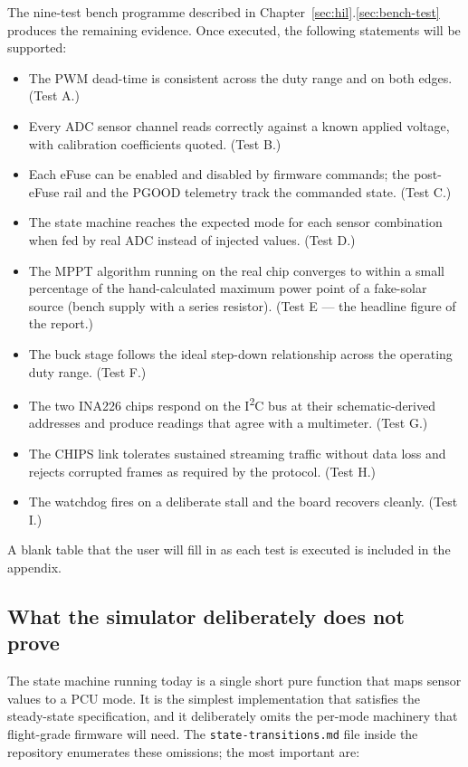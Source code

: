 The nine-test bench programme described in
Chapter~\ref{sec:hil}.\ref{sec:bench-test} produces the
remaining evidence. Once executed, the following statements
will be supported:

\begin{itemize}
\item The PWM dead-time is consistent across the duty range and
on both edges. (Test A.)
\item Every ADC sensor channel reads correctly against a known
applied voltage, with calibration coefficients quoted. (Test B.)
\item Each eFuse can be enabled and disabled by firmware
commands; the post-eFuse rail and the PGOOD telemetry track the
commanded state. (Test C.)
\item The state machine reaches the expected mode for each
sensor combination when fed by real ADC instead of injected
values. (Test D.)
\item The MPPT algorithm running on the real chip converges to
within a small percentage of the hand-calculated maximum power
point of a fake-solar source (bench supply with a series
resistor). (Test E --- the headline figure of the report.)
\item The buck stage follows the ideal step-down relationship
across the operating duty range. (Test F.)
\item The two INA226 chips respond on the I\textsuperscript{2}C
bus at their schematic-derived addresses and produce readings
that agree with a multimeter. (Test G.)
\item The CHIPS link tolerates sustained streaming traffic
without data loss and rejects corrupted frames as required by the
protocol. (Test H.)
\item The watchdog fires on a deliberate stall and the board
recovers cleanly. (Test I.)
\end{itemize}

A blank table that the user will fill in as each test is
executed is included in the appendix.

\subsection{What the simulator deliberately does not prove}
\label{sec:not-proven}

The state machine running today is a single short pure
function that maps sensor values to a PCU mode. It is the
simplest implementation that satisfies the steady-state
specification, and it deliberately omits the per-mode
machinery that flight-grade firmware will need. The
\texttt{state-transitions.md} file inside the repository
enumerates these omissions; the most important are:

